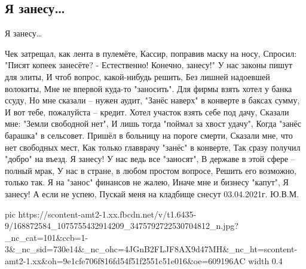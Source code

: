  
 
 
 
 

\subsection{Я занесу…}
\label{sec:03_04_2021.fb.motin_jurij.1.ja_zanesu}

Я занесу…

Чек затрещал, как лента в пулемёте,
Кассир, поправив маску на носу,
Спросил: "Писят копеек занесёте?
- Естественно! Конечно, занесу!"
У нас законы пишут для элиты,
И чтоб вопрос, какой-нибудь решить,
Без лишней надоевшей волокиты,
Мне не впервой куда-то "заносить".
Для фирмы взять хотел у банка ссуду,
Но мне сказали – нужен аудит,
"Занёс наверх" в конверте в баксах сумму,
И вот тебе, пожалуйста – кредит.
Хотел участок взять себе под дачу,
Сказали мне: "Земли свободной нет",
И лишь тогда "поймал за хвост удачу",
Когда "занёс барашка" в сельсовет.
Пришёл в больницу на пороге смерти,
Сказали мне, что нет свободных мест,
Как только главврачу "занёс" в конверте,
Так сразу получил "добро" на въезд.
Я занесу! У нас ведь все "заносят",
В державе в этой сфере – полный мрак,
У нас в стране, в любом простом вопросе,
Решить его возможно, только так.
Я на "занос" финансов не жалею,
Иначе мне и бизнесу "капут",
Я занесу! А если не успею,
Пускай меня на кладбище снесут
03.04.2021г. Ю.В.М.


\ifcmt
  pic https://scontent-amt2-1.xx.fbcdn.net/v/t1.6435-9/168872584_1075755432914209_3475792722530704812_n.jpg?_nc_cat=101&ccb=1-3&_nc_sid=730e14&_nc_ohc=4JGnB2FLJF8AX9d47MH&_nc_ht=scontent-amt2-1.xx&oh=9e1cfe706f816fd54f51f2551c51e016&oe=609196AC
  width 0.4
\fi


